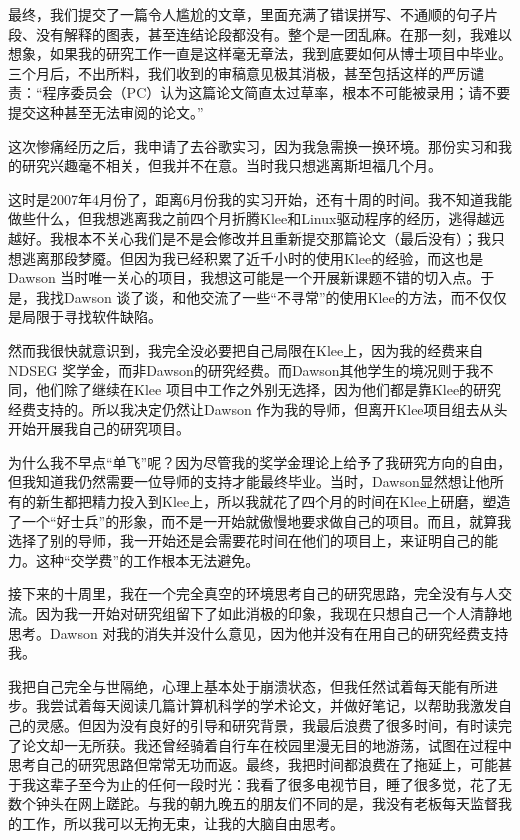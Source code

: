 \documentclass[12pt,UTF8,nofonts]{book}
\begin{document}
最终，我们提交了一篇令人尴尬的文章，里面充满了错误拼写、不通顺的句子片段、没有解释的图表，甚至连结论段都没有。整个是一团乱麻。在那一刻，我难以想象，如果我的研究工作一直是这样毫无章法，我到底要如何从博士项目中毕业。三个月后，不出所料，我们收到的审稿意见极其消极，甚至包括这样的严厉谴责：“程序委员会（PC）认为这篇论文简直太过草率，根本不可能被录用；请不要提交这种甚至无法审阅的论文。”

\breakline

这次惨痛经历之后，我申请了去谷歌实习，因为我急需换一换环境。那份实习和我的研究兴趣毫不相关，但我并不在意。当时我只想逃离斯坦福几个月。

这时是2007年4月份了，距离6月份我的实习开始，还有十周的时间。我不知道我能做些什么，但我想逃离我之前四个月折腾Klee和Linux驱动程序的经历，逃得越远越好。我根本不关心我们是不是会修改并且重新提交那篇论文（最后没有）；我只想逃离那段梦魇。但因为我已经积累了近千小时的使用Klee的经验，而这也是Dawson 当时唯一关心的项目，我想这可能是一个开展新课题不错的切入点。于是，我找Dawson 谈了谈，和他交流了一些“不寻常”的使用Klee的方法，而不仅仅是局限于寻找软件缺陷。

然而我很快就意识到，我完全没必要把自己局限在Klee上，因为我的经费来自NDSEG 奖学金，而非Dawson的研究经费。而Dawson其他学生的境况则于我不同，他们除了继续在Klee 项目中工作之外别无选择，因为他们都是靠Klee的研究经费支持的。所以我决定仍然让Dawson 作为我的导师，但离开Klee项目组去从头开始开展我自己的研究项目。

为什么我不早点“单飞”呢？因为尽管我的奖学金理论上给予了我研究方向的自由，但我知道我仍然需要一位导师的支持才能最终毕业。当时，Dawson显然想让他所有的新生都把精力投入到Klee上，所以我就花了四个月的时间在Klee上研磨，塑造了一个“好士兵”的形象，而不是一开始就傲慢地要求做自己的项目。而且，就算我选择了别的导师，我一开始还是会需要花时间在他们的项目上，来证明自己的能力。这种“交学费”的工作根本无法避免。

接下来的十周里，我在一个完全真空的环境思考自己的研究思路，完全没有与人交流。因为我一开始对研究组留下了如此消极的印象，我现在只想自己一个人清静地思考。Dawson 对我的消失并没什么意见，因为他并没有在用自己的研究经费支持我。

我把自己完全与世隔绝，心理上基本处于崩溃状态，但我任然试着每天能有所进步。我尝试着每天阅读几篇计算机科学的学术论文，并做好笔记，以帮助我激发自己的灵感。但因为没有良好的引导和研究背景，我最后浪费了很多时间，有时读完了论文却一无所获。我还曾经骑着自行车在校园里漫无目的地游荡，试图在过程中思考自己的研究思路但常常无功而返。最终，我把时间都浪费在了拖延上，可能甚于我这辈子至今为止的任何一段时光：我看了很多电视节目，睡了很多觉，花了无数个钟头在网上蹉跎。与我的朝九晚五的朋友们不同的是，我没有老板每天监督我的工作，所以我可以无拘无束，让我的大脑自由思考。
\end{document}
